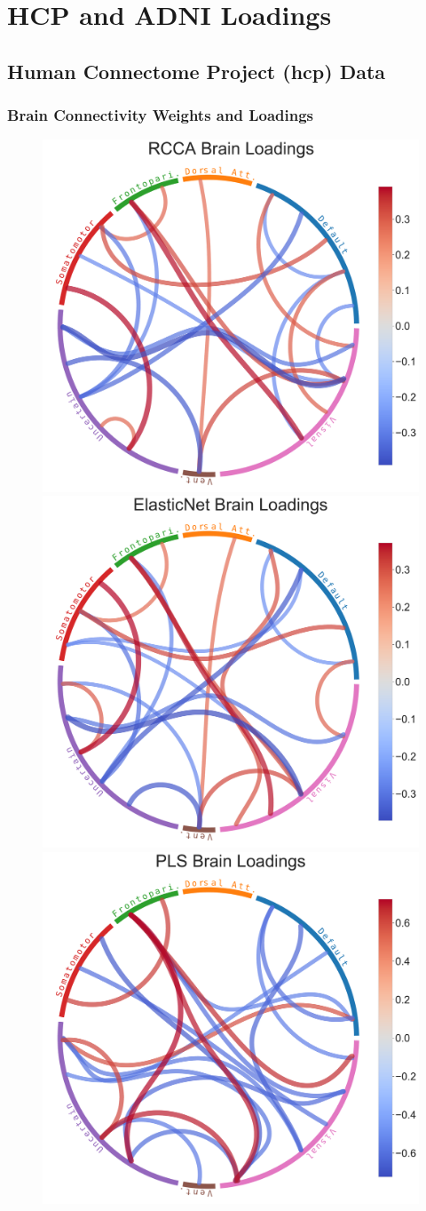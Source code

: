 \graphicspath{{chapters/loadings/}}
\section{HCP and ADNI Loadings}\label{appendix:loadings}


\subsection{Human Connectome Project (\acrshort{hcp}) Data}

\subsubsection{Brain Connectivity Weights and Loadings}

\begin{figure}
    \centering
    \includegraphics[width=0.49\linewidth]{figures/hcp/RCCA brain loadings}
    \includegraphics[width=0.49\linewidth]{figures/hcp/ElasticNet brain loadings}
    \includegraphics[width=0.49\linewidth]{figures/hcp/PLS brain loadings}

\end{figure}

